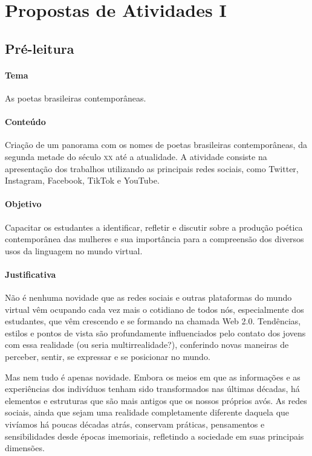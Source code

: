 \documentclass[12pt]{extarticle}
\begin{document}
	
\section{Propostas de Atividades I}


\subsection{Pré-leitura}

\paragraph{Tema} As poetas brasileiras contemporâneas.

\paragraph{Conteúdo} Criação de um panorama com os nomes de poetas
brasileiras contemporâneas, da segunda metade do século \textsc{xx} até a
atualidade. A atividade consiste na apresentação dos trabalhos
utilizando as principais redes sociais, como Twitter, Instagram,
Facebook, TikTok e YouTube.

\paragraph{Objetivo} Capacitar os estudantes a identificar, refletir e
discutir sobre a produção poética contemporânea das mulheres e sua
importância para a compreensão dos diversos usos da linguagem no mundo
virtual.

\paragraph{Justificativa} Não é nenhuma novidade que as redes sociais e
outras plataformas do mundo virtual vêm ocupando cada vez mais o
cotidiano de todos nós, especialmente dos estudantes, que vêm crescendo
e se formando na chamada Web 2.0. Tendências, estilos e pontos de vista
são profundamente influenciados pelo contato dos jovens com essa
realidade (ou seria multirrealidade?), conferindo novas maneiras de
perceber, sentir, se expressar e se posicionar no mundo.

Mas nem tudo é apenas novidade. Embora os meios em que as informações e
as experiências dos indivíduos tenham sido transformados nas últimas
décadas, há elementos e estruturas que são mais antigos que os nossos
próprios avós. As redes sociais, ainda que sejam uma realidade
completamente diferente daquela que vivíamos há poucas décadas atrás,
conservam práticas, pensamentos e sensibilidades desde épocas
imemoriais, refletindo a sociedade em suas principais dimensões.
\end{document}
